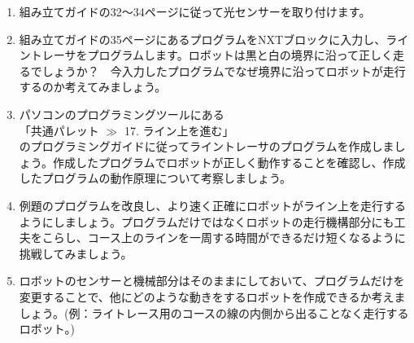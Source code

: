 
\begin{enumerate}

\item 組み立てガイドの32〜34ページに従って光センサーを取り付けます。

\item 組み立てガイドの35ページにあるプログラムをNXTブロックに入力し、ライントレーサをプログラムします。ロボットは黒と白の境界に沿って正しく走るでしょうか？　今入力したプログラムでなぜ境界に沿ってロボットが走行するのか考えてみましょう。

\item パソコンのプログラミングツールにある\\
「共通パレット $\gg$ 17. ライン上を進む」\\
のプログラミングガイドに従ってライントレーサのプログラムを作成しましょう。作成したプログラムでロボットが正しく動作することを確認し、作成したプログラムの動作原理について考察しましょう。

\item 例題のプログラムを改良し、より速く正確にロボットがライン上を走行するようにしましょう。プログラムだけではなくロボットの走行機構部分にも工夫をこらし、コース上のラインを一周する時間ができるだけ短くなるように挑戦してみましょう。

\item ロボットのセンサーと機械部分はそのままにしておいて、プログラムだけを変更することで、他にどのような動きをするロボットを作成できるか考えましょう。(例：ライトレース用のコースの線の内側から出ることなく走行するロボット。)


\end{enumerate}
